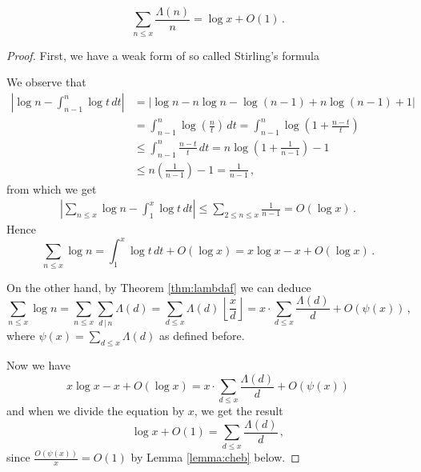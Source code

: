 \documentclass{article}
\begin{document}
\begin{lemma}
\label{lemma:lambdadd}
\begin{equation*}
    \sum_{n\leq x} \frac{\Lambda(n)}{n} = \log x + O(1)\,.
\end{equation*}
\begin{proof}
First, we have a weak form of so called Stirling's formula

We observe that
\begin{align*}
    \left\vert \log n - \int_{n-1}^n \log t \,dt \right\vert & = \vert \log n - n\log n -\log (n-1) + n\log (n-1) +1 \vert \\
    & = \int_{n-1}^n \log \left(\frac{n}{t}\right) \,dt = \int_{n-1}^n \log \left(1+\frac{n-t}{t}\right)\\
    & \leq \int_{n-1}^n \frac{n-t}{t} \,dt = n\log \left(1+\frac{1}{n-1}\right) - 1\\
    & \leq n\left(\frac{1}{n-1}\right) - 1 = \frac{1}{n-1}\,,
\end{align*}
from which we get
\begin{align*}
    \left\vert \sum_{n\leq x} \log n - \int_1^x \log t \,dt \right\vert \leq \sum_{2\leq n\leq x} \frac{1}{n-1} = O(\log x)\,.
\end{align*}
 Hence
 \begin{equation*}
     \sum_{n\leq x} \log n = \int_1^x \log t\,dt + O(\log x) = x\log x - x + O(\log x)\,.
 \end{equation*}

On the other hand, by Theorem \ref{thm:lambdaf} we can deduce
\begin{equation*}
    \sum_{n\leq x} \log n = \sum_{n\leq x} \sum_{d\,\vert\, n} \Lambda(d) = \sum_{d\leq x} \Lambda(d)\,\left\lfloor \frac{x}{d}\right\rfloor = x\cdot\sum_{d\leq x} \frac{\Lambda(d)}{d} + O(\psi(x))\,,
\end{equation*}
where $\psi(x)=\sum_{d\leq x} \Lambda(d)$ as defined before.

Now we have
\begin{equation*}
    x\log x - x + O(\log x) = x\cdot\sum_{d\leq x} \frac{\Lambda(d)}{d} + O(\psi(x))
\end{equation*}
and when we divide the equation by $x$, we get the result
\begin{equation*}
    \log x + O(1) = \sum_{d\leq x} \frac{\Lambda(d)}{d}\,,
\end{equation*}
since $\frac{O(\psi(x))}{x}=O(1)$ by Lemma \ref{lemma:cheb} below.
\end{proof}
\end{lemma}
\end{document}
